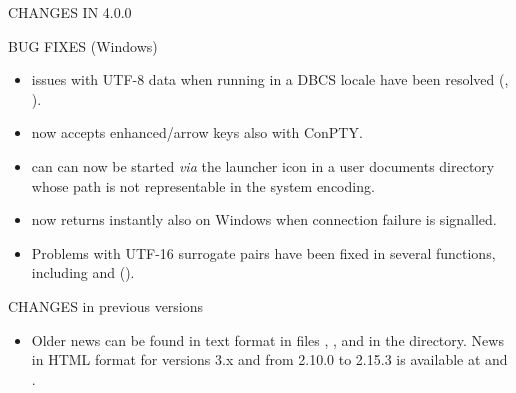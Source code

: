 \documentclass[letterpaper]{book}
\begin{document}
\begin{Section}{ CHANGES IN 4.0.0}
\begin{SubSection}{BUG FIXES (Windows)}
\begin{itemize}
\item{}  issues with UTF-8 data when running in a DBCS
locale have been resolved (, ).

\item{}  now accepts enhanced/arrow keys also with
ConPTY.

\item{} \R{} can can now be started \emph{via} the launcher icon in a
user documents directory whose path is not representable in the
system encoding.

\item{}  now returns instantly
also on Windows when connection failure is signalled.

\item{} Problems with UTF-16 surrogate pairs have been fixed in
several functions, including  and
 ().

\end{itemize}


\end{SubSection}

\end{Section}
%
\begin{Section}{CHANGES in previous versions}
\begin{itemize}

\item{} Older news can be found in text format in files
, ,
 and 
in the  directory.  News in HTML format for
\R{}  versions 3.x and from 2.10.0 to 2.15.3 is available at
and
.

\end{itemize}

\end{Section}
\end{document}
